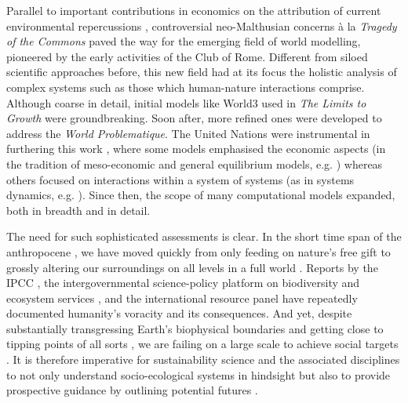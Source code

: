 \documentclass{article}
\begin{document}
\begin{refsection}
Parallel to important contributions in economics on the attribution of current environmental repercussions \parencite[see for example][]{leontief_1970,leontief_1972}, controversial neo-Malthusian concerns à la \textit{Tragedy of the Commons} \parencite{hardin_1968,ostrom_1999,mildenberger_2019} paved the way for the emerging field of world modelling, pioneered by the early activities of the Club of Rome. 
Different from siloed scientific approaches before, this new field had at its focus the holistic analysis of complex systems such as those which human-nature interactions comprise. 
Although coarse in detail, initial models like World3 used in \textit{The Limits to Growth} \parencite{meadows_1972} were groundbreaking. 
Soon after, more refined ones were developed to address the \textit{World Problematique}. 
The United Nations were instrumental in furthering this work \parencite{fontela_2004}, where some models emphasised the economic aspects (in the tradition of meso-economic and general equilibrium models, e.g. \textcite{leontief_1974}) whereas others focused on interactions within a system of systems (as in systems dynamics, e.g. \textcite{mesarovic_1974}). 
Since then, the scope of many computational models expanded, both in breadth and in detail.

The need for such sophisticated assessments is clear. 
In the short time span of the anthropocene \parencite{crutzen_2006}, we have moved quickly from only feeding on nature's free gift \parencite{karsten_1987} to grossly altering our surroundings on all levels in a full world \parencite{daly_2005}. 
Reports by the IPCC \parencite[e.g.][]{ipcc_2022}, the intergovernmental science-policy platform on biodiversity and ecosystem services \parencite*[e.g. IPBES,][]{ipbes_2019}, and the international resource panel \parencite[e.g.][]{unep_2016} have repeatedly documented humanity's voracity and its consequences. 
And yet, despite substantially transgressing Earth's biophysical boundaries and getting close to tipping points of all sorts \parencite{ceballos_2015,steffen_2015, steffen_2018}, we are failing on a large scale to achieve social targets \parencite{fanning_2022}. 
It is therefore imperative for sustainability science and the associated disciplines to not only understand socio-ecological systems in hindsight \parencite{kates_2001} but also to provide prospective guidance by outlining potential futures \parencite{swart_2004}.\footnotemark{}



\end{refsection}
\end{document}
